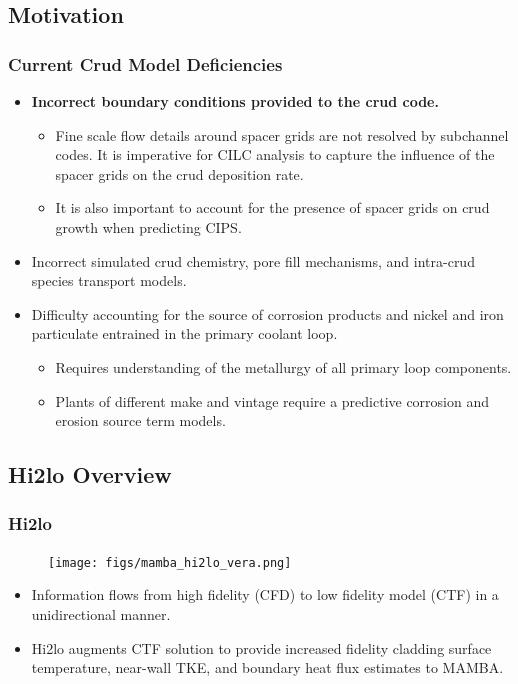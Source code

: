 \documentclass[t, pdftex]{beamer}
\begin{document}
\subsection*{Motivation}
\begin{frame}
\frametitle{Current Crud Model Deficiencies}
\begin{itemize}
    \item \textbf{Incorrect boundary conditions provided to the crud code.}
    \begin{itemize}
        \item Fine scale flow details around spacer grids are not resolved by subchannel codes.  It is imperative for CILC analysis to capture the influence of the spacer grids on the crud deposition rate.  
        \item It is also important to account for the presence of spacer grids on crud growth when predicting CIPS.
    \end{itemize}
    \item Incorrect simulated crud chemistry, pore fill mechanisms, and intra-crud species transport models.
    \item Difficulty accounting for the source of corrosion products and nickel and iron particulate entrained in the primary coolant loop.
    \begin{itemize}
        \item Requires understanding of the metallurgy of all primary loop components. 
        \item Plants of different make and vintage require a predictive corrosion and erosion source term models.
    \end{itemize}
\end{itemize}
\end{frame}


\subsection*{Hi2lo Overview}
\begin{frame}
\frametitle{Hi2lo}
\begin{figure}[]
    \vspace{-16.5pt}
    \centering
    \texttt{[image: figs/mamba\_hi2lo\_vera.png]}
    \label{hi2lo_overview}
\end{figure}
\vspace{-16.5pt}
\begin{itemize}
    \item Information flows from high fidelity (CFD) to low fidelity model (CTF) in a unidirectional manner.
    \item Hi2lo augments CTF solution to provide increased fidelity cladding surface temperature, near-wall TKE, and boundary heat flux estimates to MAMBA.
\end{itemize}
\end{frame}
\end{document}
